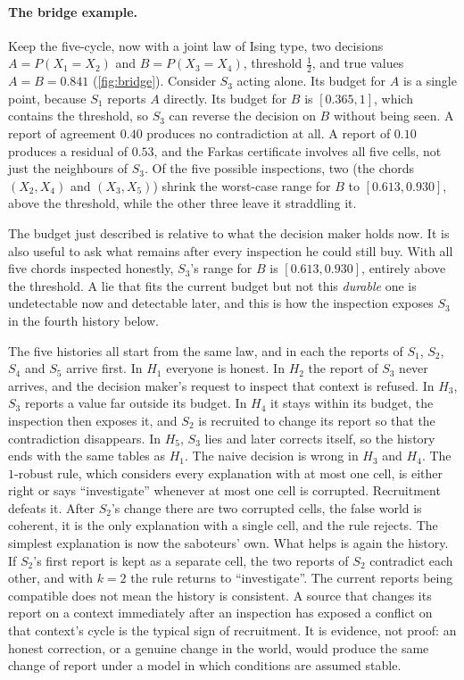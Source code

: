 \documentclass[11pt]{article}
\theoremstyle{definition}\newtheorem{definition}[theorem]{Definition}\newtheorem{remark}[theorem]{Remark}\newtheorem{example}[theorem]{Example}\newtheorem{problem}[theorem]{Open problem}\crefname{problem}{Problem}{Problems}
\begin{document}
\paragraph{The bridge example.} Keep the five-cycle, now with a joint law of Ising type, two decisions $A=P(X_1=X_2)$ and $B=P(X_3=X_4)$, threshold $\tfrac12$, and true values $A=B=0.841$ (\cref{fig:bridge}). Consider $S_3$ acting alone. Its budget for $A$ is a single point, because $S_1$ reports $A$ directly. Its budget for $B$ is $[0.365,1]$, which contains the threshold, so $S_3$ can reverse the decision on $B$ without being seen. A report of agreement $0.40$ produces no contradiction at all. A report of $0.10$ produces a residual of $0.53$, and the Farkas certificate involves all five cells, not just the neighbours of $S_3$. Of the five possible inspections, two (the chords $(X_2,X_4)$ and $(X_3,X_5)$) shrink the worst-case range for $B$ to $[0.613,0.930]$, above the threshold, while the other three leave it straddling it.

The budget just described is relative to what the decision maker holds now. It is also useful to ask what remains after every inspection he could still buy. With all five chords inspected honestly, $S_3$'s range for $B$ is $[0.613,0.930]$, entirely above the threshold. A lie that fits the current budget but not this \emph{durable} one is undetectable now and detectable later, and this is how the inspection exposes $S_3$ in the fourth history below.

The five histories all start from the same law, and in each the reports of $S_1$, $S_2$, $S_4$ and $S_5$ arrive first. In $H_1$ everyone is honest. In $H_2$ the report of $S_3$ never arrives, and the decision maker's request to inspect that context is refused. In $H_3$, $S_3$ reports a value far outside its budget. In $H_4$ it stays within its budget, the inspection then exposes it, and $S_2$ is recruited to change its report so that the contradiction disappears. In $H_5$, $S_3$ lies and later corrects itself, so the history ends with the same tables as $H_1$. The naive decision is wrong in $H_3$ and $H_4$. The $1$-robust rule, which considers every explanation with at most one cell, is either right or says ``investigate'' whenever at most one cell is corrupted. Recruitment defeats it. After $S_2$'s change there are two corrupted cells, the false world is coherent, it is the only explanation with a single cell, and the rule rejects. The simplest explanation is now the saboteurs' own. What helps is again the history. If $S_2$'s first report is kept as a separate cell, the two reports of $S_2$ contradict each other, and with $k=2$ the rule returns to ``investigate''. The current reports being compatible does not mean the history is consistent. A source that changes its report on a context immediately after an inspection has exposed a conflict on that context's cycle is the typical sign of recruitment. It is evidence, not proof: an honest correction, or a genuine change in the world, would produce the same change of report under a model in which conditions are assumed stable.
\end{document}
